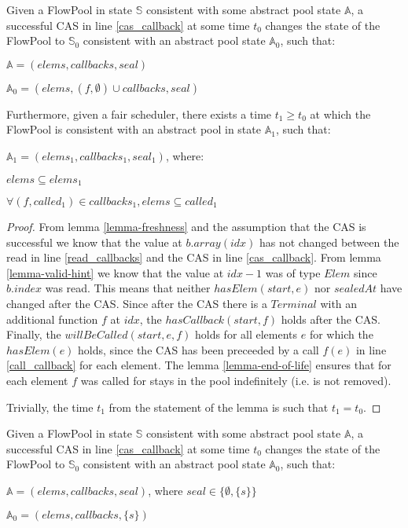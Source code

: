 \documentclass[runningheads,a4paper]{llncs}
\begin{document}
\begin{lemma}\label{lemma-foreach}
Given a FlowPool in state $\mathbb{S}$ consistent with some abstract pool state $\mathbb{A}$, 
a successful CAS in line \ref{cas_callback} at some time $t_0$ changes the state of the FlowPool 
to $\mathbb{S}_0$ consistent with an abstract pool state $\mathbb{A}_0$, such that:

$\mathbb{A} = (elems, callbacks, seal)$

$\mathbb{A}_0 = (elems, (f, \emptyset) \cup callbacks, seal)$

Furthermore, given a fair scheduler, there exists a time $t_1 \geq t_0$ at which the FlowPool 
is consistent with an abstract pool in state $\mathbb{A}_1$, such that:

$\mathbb{A}_1 = (elems_1, callbacks_1, seal_1)$, where:

$elems \subseteq elems_1$

$\forall (f, called_1) \in callbacks_1, elems \subseteq called_1$
\end{lemma}

\begin{proof}
From lemma \ref{lemma-freshness} and the assumption that the CAS is
successful we know that the value at $b.array(idx)$ has not changed
between the read in line \ref{read_callbacks} and the CAS in line
\ref{cas_callback}.
From lemma \ref{lemma-valid-hint} we know that the value at $idx - 1$
was of type $Elem$ since $b.index$ was read.
This means that neither $hasElem(start, e)$ nor $sealedAt$ have changed after the CAS.
Since after the CAS there is a $Terminal$ with an additional function $f$ at $idx$,
the $hasCallback(start, f)$ holds after the CAS.
Finally, the $willBeCalled(start, e, f)$ holds for all elements $e$
for which the $hasElem(e)$ holds, since the CAS has been preceeded by
a call $f(e)$ in line \ref{call_callback} for each element. The lemma
\ref{lemma-end-of-life} ensures that for each element $f$ was called
for stays in the pool indefinitely (i.e. is not removed).

Trivially, the time $t_1$ from the statement of the lemma is such that $t_1 = t_0$.
\end{proof}


\begin{lemma}\label{lemma-seal}
Given a FlowPool in state $\mathbb{S}$ consistent with some abstract pool state $\mathbb{A}$, 
a successful CAS in line \ref{cas_callback} at some time $t_0$ changes the state of the FlowPool 
to $\mathbb{S}_0$ consistent with an abstract pool state $\mathbb{A}_0$, such that:

$\mathbb{A} = (elems, callbacks, seal)$, where $seal \in \{ \emptyset, \{ s \} \}$

$\mathbb{A}_0 = (elems, callbacks, \{ s \})$
\end{lemma}
\end{document}

